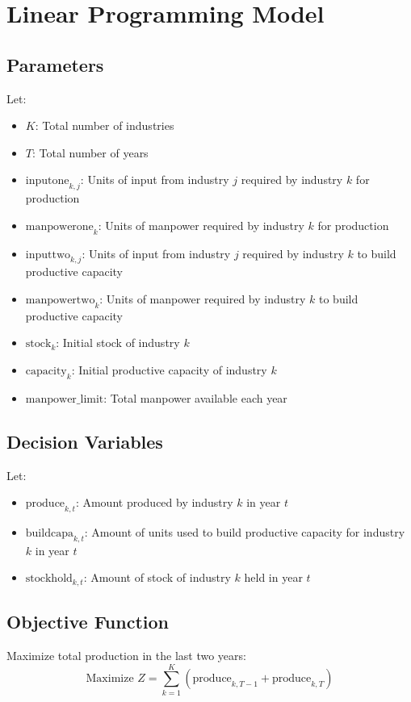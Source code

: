 \documentclass{article}
\begin{document}
\section*{Linear Programming Model}

\subsection*{Parameters}
Let:
\begin{itemize}
    \item \( K \): Total number of industries
    \item \( T \): Total number of years
    \item \( \text{inputone}_{k,j} \): Units of input from industry \( j \) required by industry \( k \) for production
    \item \( \text{manpowerone}_{k} \): Units of manpower required by industry \( k \) for production
    \item \( \text{inputtwo}_{k,j} \): Units of input from industry \( j \) required by industry \( k \) to build productive capacity
    \item \( \text{manpowertwo}_{k} \): Units of manpower required by industry \( k \) to build productive capacity
    \item \( \text{stock}_{k} \): Initial stock of industry \( k \)
    \item \( \text{capacity}_{k} \): Initial productive capacity of industry \( k \)
    \item \( \text{manpower\_limit} \): Total manpower available each year
\end{itemize}

\subsection*{Decision Variables}
Let:
\begin{itemize}
    \item \( \text{produce}_{k,t} \): Amount produced by industry \( k \) in year \( t \)
    \item \( \text{buildcapa}_{k,t} \): Amount of units used to build productive capacity for industry \( k \) in year \( t \)
    \item \( \text{stockhold}_{k,t} \): Amount of stock of industry \( k \) held in year \( t \)
\end{itemize}

\subsection*{Objective Function}
Maximize total production in the last two years:
\[
\text{Maximize } Z = \sum_{k=1}^{K} \left( \text{produce}_{k,T-1} + \text{produce}_{k,T} \right)
\]
\end{document}
